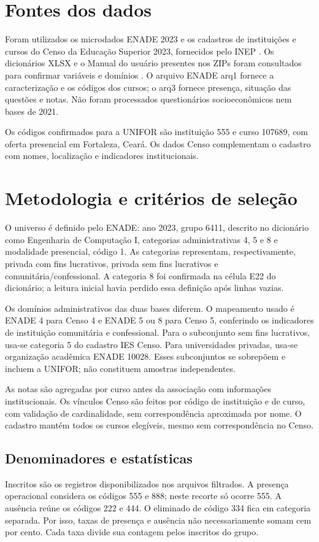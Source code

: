 \documentclass[12pt,a4paper]{article}
\begin{document}
\section{Fontes dos dados}
Foram utilizados os microdados ENADE 2023 e os cadastros de instituições e
cursos do Censo da Educação Superior 2023, fornecidos pelo INEP
\cite{enade,censo}. Os dicionários XLSX e o Manual do usuário presentes nos
ZIPs foram consultados para confirmar variáveis e domínios \cite{manual}.
O arquivo ENADE arq1 fornece a caracterização e os códigos dos cursos; o arq3
fornece presença, situação das questões e notas. Não foram processados
questionários socioeconômicos nem bases de 2021.

Os códigos confirmados para a UNIFOR são instituição 555 e curso 107689,
com oferta presencial em Fortaleza, Ceará. Os dados Censo complementam o
cadastro com nomes, localização e indicadores institucionais.

\section{Metodologia e critérios de seleção}
O universo é definido pelo ENADE: ano 2023, grupo 6411, descrito no dicionário
como Engenharia de Computação I, categorias administrativas 4, 5 e 8 e
modalidade presencial, código 1. As categorias representam, respectivamente,
privada com fins lucrativos, privada sem fins lucrativos e
comunitária/confessional. A categoria 8 foi confirmada na célula E22 do
dicionário; a leitura inicial havia perdido essa definição após linhas vazias.

Os domínios administrativos das duas bases diferem. O mapeamento usado é
ENADE 4 para Censo 4 e ENADE 5 ou 8 para Censo 5, conferindo os indicadores
de instituição comunitária e confessional. Para o subconjunto sem fins
lucrativos, usa-se categoria 5 do cadastro IES Censo. Para universidades
privadas, usa-se organização acadêmica ENADE 10028. Esses subconjuntos se
sobrepõem e incluem a UNIFOR; não constituem amostras independentes.

As notas são agregadas por curso antes da associação com informações
institucionais. Os vínculos Censo são feitos por código de instituição e de
curso, com validação de cardinalidade, sem correspondência aproximada por nome.
O cadastro mantém todos os cursos elegíveis, mesmo sem correspondência no Censo.

\subsection{Denominadores e estatísticas}
Inscritos são os registros disponibilizados nos arquivos filtrados. A presença
operacional considera os códigos 555 e 888; neste recorte só ocorre 555.
A ausência reúne os códigos 222 e 444. O eliminado de código 334 fica em
categoria separada. Por isso, taxas de presença e ausência não necessariamente
somam cem por cento. Cada taxa divide sua contagem pelos inscritos do grupo.
\end{document}
